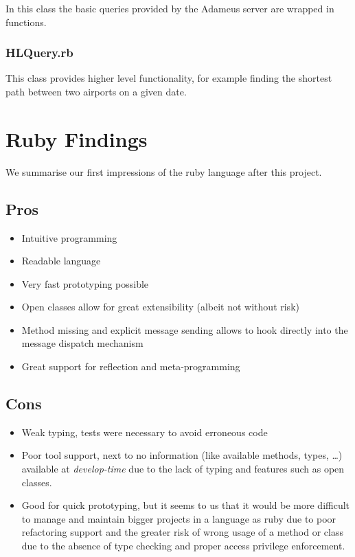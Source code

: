 \documentclass[11pt,pdftex,oneside]{article}
\begin{document}
In this class the basic queries provided by the Adameus server are wrapped
in functions.

\subsubsection{HLQuery.rb}

This class provides higher level functionality, for example finding the
shortest path between two airports on a given date.

\section{Ruby Findings}
We summarise our first impressions of the ruby language after this project.

\subsection{Pros}

\begin{itemize}
  \item Intuitive programming
  \item Readable language
  \item Very fast prototyping possible
  \item Open classes allow for great extensibility (albeit not without
    risk)
  \item Method missing and explicit message sending allows to hook
    directly into the message dispatch mechanism
  \item Great support for reflection and meta-programming
\end{itemize}

\subsection{Cons}

\begin{itemize}
  \item Weak typing, tests were necessary to avoid erroneous code
  \item Poor tool support, next to no information (like available methods,
    types, \ldots) available at \emph{develop-time} due to the lack of
    typing and features such as open classes.
  \item Good for quick prototyping, but it seems to us that it would be
    more difficult to manage and maintain bigger projects in a language as
    ruby due to poor refactoring support and the greater risk of wrong
    usage of a method or class due to the absence of type checking and
    proper access privilege enforcement.
\end{itemize}
\end{document}
